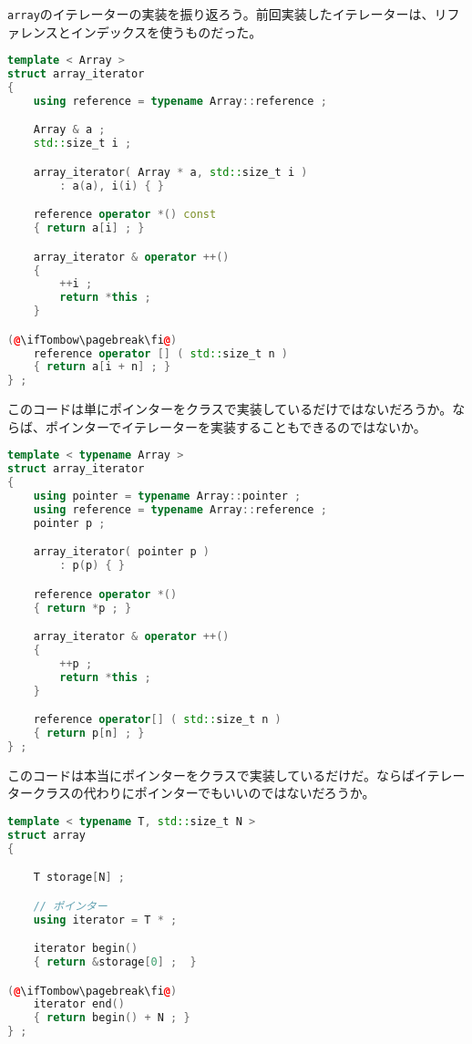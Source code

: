 

\texttt{array}のイテレーターの実装を振り返ろう。前回実装したイテレーターは、リファレンスとインデックスを使うものだった。

\begin{lstlisting}[language={C++}]
template < Array >
struct array_iterator
{
    using reference = typename Array::reference ;

    Array & a ;
    std::size_t i ;

    array_iterator( Array * a, std::size_t i )
        : a(a), i(i) { }

    reference operator *() const
    { return a[i] ; }

    array_iterator & operator ++()
    {
        ++i ;
        return *this ;
    }

(@\ifTombow\pagebreak\fi@)
    reference operator [] ( std::size_t n )
    { return a[i + n] ; }
} ;
\end{lstlisting}

このコードは単にポインターをクラスで実装しているだけではないだろうか。ならば、ポインターでイテレーターを実装することもできるのではないか。

\begin{lstlisting}[language={C++}]
template < typename Array >
struct array_iterator
{
    using pointer = typename Array::pointer ;
    using reference = typename Array::reference ;
    pointer p ;

    array_iterator( pointer p )
        : p(p) { }

    reference operator *()
    { return *p ; }

    array_iterator & operator ++()
    {
        ++p ;
        return *this ;
    }

    reference operator[] ( std::size_t n )
    { return p[n] ; }
} ;
\end{lstlisting}

このコードは本当にポインターをクラスで実装しているだけだ。ならばイテレータークラスの代わりにポインターでもいいのではないだろうか。

\begin{lstlisting}[language={C++}]
template < typename T, std::size_t N >
struct array
{

    T storage[N] ;

    // ポインター
    using iterator = T * ;

    iterator begin()
    { return &storage[0] ;  }

(@\ifTombow\pagebreak\fi@)
    iterator end()
    { return begin() + N ; }
} ;
\end{lstlisting}

